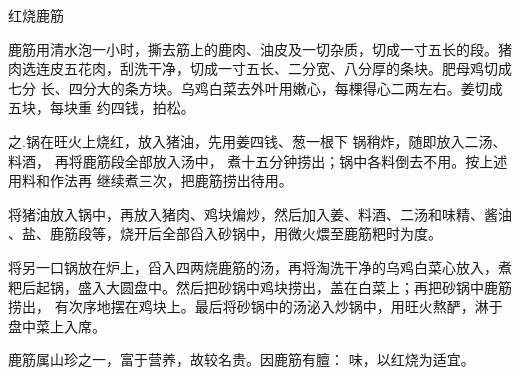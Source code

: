 \begin{recipe}{红烧鹿筋}

\ingredients


\preparation

\step 鹿筋用清水泡一小时，撕去筋上的鹿肉、油皮及一切杂质，切成一寸五长的段。猪
肉选连皮五花肉，刮洗干净，切成一寸五长、二分宽、八分厚的条块。肥母鸡切成七分
长、四分大的条方块。乌鸡白菜去外叶用嫩心，每棵得心二两左右。姜切成五块，每块重
约四钱，拍松。

之.锅在旺火上烧红，放入猪油，先用姜四钱、葱一根下 锅稍炸，随即放入二汤、料酒，
再将鹿筋段全部放入汤中， 煮十五分钟捞出；锅中各料倒去不用。按上述用料和作法再
继续煮三次，把鹿筋捞出待用。

\step 将猪油放入锅中，再放入猪肉、鸡块煸炒，然后加入姜、料酒、二汤和味精、酱油
、盐、鹿筋段等，烧开后全部舀入砂锅中，用微火煨至鹿筋粑时为度。

\step 将另一口锅放在炉上，舀入四两烧鹿筋的汤，再将淘洗干净的乌鸡白菜心放入，煮
粑后起锅，盛入大圆盘中。然后把砂锅中鸡块捞出，盖在白菜上；再把砂锅中鹿筋捞出，
有次序地摆在鸡块上。最后将砂锅中的汤泌入炒锅中，用旺火熬酽，淋于盘中菜上入席。

\features

鹿筋属山珍之一，富于营养，故较名贵。因鹿筋有膻： 味，以红烧为适宜。

\end{recipe}


